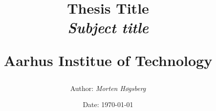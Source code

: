 \newcommand{\authorName}{Morten Høgsberg}
\newcommand{\titleName}{Thesis Title}
\newcommand{\subject}{Subject title}
\newcommand{\institute}{Aarhus Institue of Technology}
\begin{titlepage}
  \centering
    \title
    {
      \Huge \textbf{\titleName}\\
      \scale{\numberSQRTTWO}{\vspace{\sol pt}}
      \LARGE \textit{\subject}
      \scale{\numberSQRTTWO}{\rule{\linewidth}{\sol pt}}

      \textbf{\institute}
      \author
    {
      \LARGE Author: \textit{\authorName}
    }
      \date{\LARGE Date: \today}
    }
\end{titlepage}
